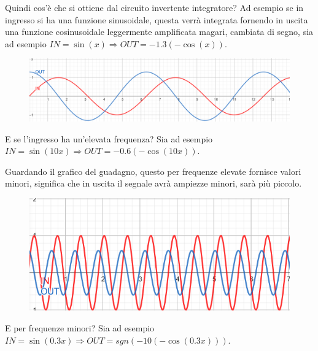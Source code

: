 \documentclass[a4paper, 15pt]{article}
\begin{document}
\begin{adjustwidth}{2in}{}
   		Quindi cos'è che si ottiene dal circuito invertente integratore? Ad esempio se in ingresso si ha una funzione sinusoidale, questa verrà integrata fornendo in uscita una funzione cosinusoidale leggermente amplificata magari, cambiata di segno, sia ad esempio $IN = \sin(x) \Rightarrow OUT = -1.3(-\cos(x))$. 
   		\begin{figure}[H]
   			\centering
   			\includegraphics[width=0.8\linewidth]{immagini/integratore1} 	
   			\label{fig:integratore1}
   		\end{figure}  		
   		E se l'ingresso ha un'elevata frequenza? Sia ad esempio $IN = \sin(10x) \Rightarrow OUT = -0.6(-\cos(10x))$.
   		
   		Guardando il grafico del guadagno, questo per frequenze elevate fornisce valori minori, significa che in uscita il segnale avrà ampiezze minori, sarà più piccolo. 
   		\begin{figure}[H]
   			\centering
   			\includegraphics[width=0.7\linewidth]{immagini/integratore2}   	
   			\label{fig:integratore2}
   		\end{figure} 		
   		E per frequenze minori? Sia ad esempio $IN = \sin(0.3x) \Rightarrow OUT = sgn(-10(-\cos(0.3x)))$.
   		

\end{adjustwidth}
\end{document}
